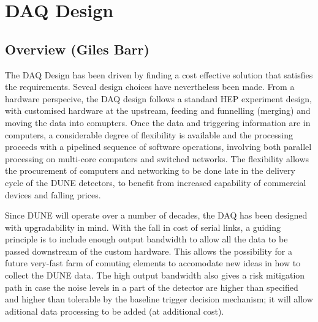 
\section{DAQ Design}
\label{sec:fdsp-daq-design}



\subsection{Overview (Giles Barr)}
\label{sec:fdsp-daq-ltr}


The DAQ Design has been driven by finding a cost effective solution
that satisfies the requirements. Seveal design choices have
nevertheless been made.  From a hardware perspecive, the DAQ design
follows a standard HEP experiment design, with customised hardware at
the upstream, feeding and funnelling (merging) and moving the data
into comupters.  Once the data and triggering information are in
computers, a considerable degree of flexibility is available and the
processing proceeds with a pipelined sequence of software operations,
involving both parallel processing on multi-core computers and
switched networks. The flexibility allows the procurement of computers
and networking to be done late in the delivery cycle of the DUNE
detectors, to benefit from increased capability of commercial devices
and falling prices.

Since DUNE will operate over a number of decades, the DAQ has been
designed with upgradability in mind.  With the fall in cost of serial
links, a guiding principle is to include enough output bandwidth to
allow all the data to be passed downstream of the custom hardware.
This allows the possibility for a future very-fast farm of comuting
elements to accomodate new ideas in how to collect the DUNE data.  The
high output bandwidth also gives a risk mitigation path in case the
noise levels in a part of the detector are higher than specified and
higher than tolerable by the baseline trigger decision mechanism; it
will allow aditional data processing to be added (at additional cost).

